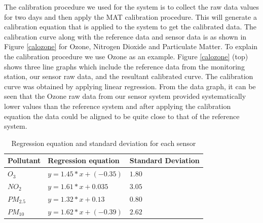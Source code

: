 The calibration procedure we used for the system is to collect the raw data values for two days and then apply the MAT calibration procedure. This will generate a calibration equation that is applied to the system to get the calibrated data. 
The calibration curve along with the reference data and sensor data is as shown in  Figure \ref{calozone} for Ozone, Nitrogen Dioxide and Particulate Matter. To explain the calibration procedure we use Ozone as an example. Figure \ref{calozone}  (top) shows three line graphs which include the reference data from the monitoring station, our sensor raw data, and the resultant calibrated curve. The calibration curve was obtained by applying linear regression. From the data graph, it can be seen that the Ozone raw data from our sensor system provided systematically lower values than the reference system and after applying the calibration equation the data could be aligned to be quite close to that of the reference system.



\begingroup
\setlength{\tabcolsep}{10pt} %
\renewcommand{\arraystretch}{2.0} %
\begin{table}[h]
  
  
  \begin{tabularx}{\columnwidth}{X|X|X}
      \hline
      Pollutant          & Regression equation  & Standard Deviation  \\
      \hline
  
   
    
    




    
    $O_{3}$   & $y = 1.45 * x + (-0.35)$ & $1.80$ \\ 
    $NO_{2}$   & $y = 1.61 * x + 0.035$ & $3.05$\\ 
    $PM_{2.5}$   & $y = 1.32 * x + 0.13$ & $0.80$\\ 
    $PM_{10}$   & $y = 1.62* x + (-0.39)$ & $2.62$\\ \hline
  
   
      
    
\end{tabularx}
 
  \caption{Regression equation and standard deviation for each sensor}
  \label{tableequation}
  \hspace{1 cm}
\end{table}
\endgroup











